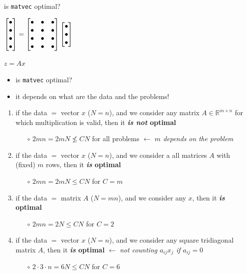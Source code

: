 \documentclass[10pt,
               svgnames,
               hyperref={colorlinks,citecolor=DeepPink4,linkcolor=FireBrick,urlcolor=Maroon},
               usepdftitle=false]{beamer}
\newcommand{\RR}{\mathbb{R}}
\newcommand{\ftt}[1]{{\color{blue} \texttt{#1}}}
\begin{document}
\begin{frame}{is \texttt{matvec} optimal?}

\hfill
{\scriptsize $\displaystyle \begin{bmatrix} \bullet \\ \bullet \\ \bullet \\ \bullet \end{bmatrix} = \begin{bmatrix} \bullet & \bullet & \bullet \\ \bullet & \bullet & \bullet \\ \bullet & \bullet & \bullet \\ \bullet & \bullet & \bullet \end{bmatrix} \begin{bmatrix} \bullet \\ \bullet \\ \bullet \end{bmatrix}$}

\vspace{2mm}

\hfill
{\scriptsize $z = A x$} \hspace{17mm}

\vspace{-8mm}
\begin{itemize}
\item is \ftt{matvec} optimal?
\item it depends on what are the \alert{data} and the \alert{problems}!
\end{itemize}

\begin{enumerate}
\item<2->[1.] if the \alert{data $=$ vector $x$} ($N=n$), and we consider \alert{any matrix $A\in\RR^{m\times n}$ for which multiplication is valid}, then it \textbf{\emph{is not} optimal}
    \begin{itemize}
    \item[$\circ$] $2mn = 2m N \nleq C N$ for all problems \hfill $\gets$ \emph{$m$ depends on the problem}
    \end{itemize}
\item<3->[2.] if the \alert{data $=$ vector $x$} ($N=n$), and we consider a \alert{all matrices $A$ with (fixed) $m$ rows}, then it \textbf{\emph{is} optimal}
    \begin{itemize}
    \item[$\circ$] $2mn = 2m N \leq C N$ for $C=m$
    \end{itemize}
\item<4->[3.] if the \alert{data $=$ matrix $A$} ($N=mn$), and we consider \alert{any $x$}, then it \textbf{\emph{is} optimal}
    \begin{itemize}
    \item[$\circ$] $2mn = 2 N \leq C N$ for $C=2$
    \end{itemize}
\item<5>[4.] if the \alert{data $=$ vector $x$} ($N=n$), and we consider \alert{any square tridiagonal matrix $A$}, then it \textbf{\emph{is} optimal} \hfill $\gets$ \emph{not counting $a_{ij}x_j$ if $a_{ij}=0$}
    \begin{itemize}
    \item[$\circ$] $2\cdot 3\cdot n = 6 N \leq C N$ for $C=6$
    \end{itemize}
\end{enumerate}
\end{frame}
\end{document}
